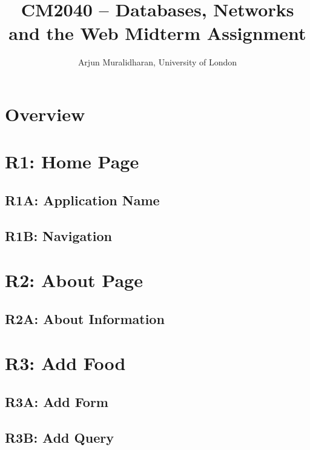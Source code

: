 \documentclass[
]{article}
\title{CM2040 -- Databases, Networks and the Web Midterm Assignment}
\author{Arjun Muralidharan, University of London}
\date{}
\begin{document}
\maketitle

{
\setcounter{tocdepth}{3}
\tableofcontents
}
\newpage

\hypertarget{overview}{%
\section{Overview}\label{overview}}

\hypertarget{r1-home-page}{%
\section{R1: Home Page}\label{r1-home-page}}

\hypertarget{r1a-application-name}{%
\subsection{R1A: Application Name}\label{r1a-application-name}}

\hypertarget{r1b-navigation}{%
\subsection{R1B: Navigation}\label{r1b-navigation}}

\hypertarget{r2-about-page}{%
\section{R2: About Page}\label{r2-about-page}}

\hypertarget{r2a-about-information}{%
\subsection{R2A: About Information}\label{r2a-about-information}}

\hypertarget{r3-add-food}{%
\section{R3: Add Food}\label{r3-add-food}}

\hypertarget{r3a-add-form}{%
\subsection{R3A: Add Form}\label{r3a-add-form}}

\hypertarget{r3b-add-query}{%
\subsection{R3B: Add Query}\label{r3b-add-query}}
\end{document}
